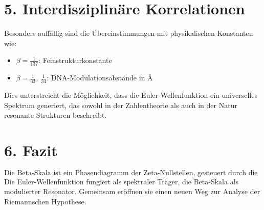 \documentclass[12pt]{article}
\begin{document}
\section*{5. Interdisziplinäre Korrelationen}

Besonders auffällig sind die Übereinstimmungen mit physikalischen Konstanten wie:
\begin{itemize}
  \item \( \beta = \frac{1}{137} \): Feinstrukturkonstante
  \item \( \beta = \frac{1}{33},\ \frac{1}{34} \): DNA-Modulationsabstände in \AA
\end{itemize}
Dies unterstreicht die Möglichkeit, dass die Euler-Wellenfunktion ein universelles Spektrum generiert, das sowohl in der Zahlentheorie als auch in der Natur resonante Strukturen beschreibt.

\vspace{1em}

\section*{6. Fazit}

\[
\boxed{
\text{Die Beta-Skala ist ein Phasendiagramm der Zeta-Nullstellen, gesteuert durch die Primwellen der Euler-Funktion.}
}
\]
Die Euler-Wellenfunktion fungiert als spektraler Träger, die Beta-Skala als modulierter Resonator. Gemeinsam eröffnen sie einen neuen Weg zur Analyse der Riemannschen Hypothese.
\end{document}
